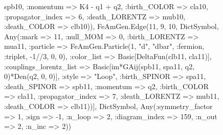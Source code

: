 \documentclass{revtex4}
\begin{document}
\begin{figure}[!htb]
\begin{center}
{spb10, :momentum => K4 - q1 + q2, :birth_COLOR => cla10, :propagator_index => 6, :death_LORENTZ => mub10, :death_COLOR => clb10)), FeAmGen.Edge(11, 9, 10, Dict{Symbol, Any}(:mark => 11, :null_MOM => 0, :birth_LORENTZ => mua11, :particle => FeAmGen.Particle(1, "d", "dbar", :fermion, :triplet, -1//3, 0, 0), :color_list => Basic[DeltaFun(clb11, cla11)], :couplings_lorentz_list => Basic[im*GAij(spb11, spa11, q2, 0)*Den(q2, 0, 0)], :style => "Loop", :birth_SPINOR => spa11, :death_SPINOR => spb11, :momentum => q2, :birth_COLOR => cla11, :propagator_index => 7, :death_LORENTZ => mub11, :death_COLOR => clb11))], Dict{Symbol, Any}(:symmetry_factor => 1, :sign => -1, :n_loop => 2, :diagram_index => 159, :n_out => 2, :n_inc => 2)) 
}
\end{center}
\end{figure}
\end{document}
